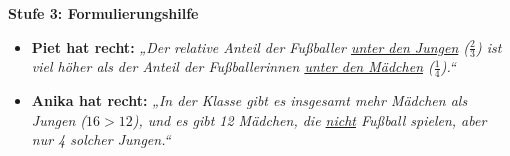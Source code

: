\documentclass[a4paper,10pt]{article}
\newcommand{\mFrac}[2]{\frac{#1}{#2}}
\begin{document}
\begin{tcolorbox}[
    enhanced, colback=white, colframe=primaryBlue, arc=3mm, boxrule=1.2pt,
    left=4.5mm, right=4.5mm, top=2.5mm, bottom=2.5mm, height=12.9cm
]
    \begin{tcolorbox}[colback=step3Bg, colframe=step3Border, arc=2mm, boxrule=0.7pt, left=3mm, right=3mm, top=1.8mm, bottom=1.8mm]
        {\color{step3Text}\bfseries\faCheckCircle\enskip Stufe 3: Formulierungshilfe}\\[0.8mm]
        {\small
        \begin{itemize}[leftmargin=4mm, itemsep=0.2pt, topsep=1pt]
            \item \textbf{Piet hat recht:} \textit{„Der relative Anteil der Fußballer \underline{unter den Jungen} ($\mFrac{2}{3}$) ist viel höher als der Anteil der Fußballerinnen \underline{unter den Mädchen} ($\mFrac{1}{4}$).“}
            \item \textbf{Anika hat recht:} \textit{„In der Klasse gibt es insgesamt mehr Mädchen als Jungen ($16 > 12$), und es gibt 12 Mädchen, die \underline{nicht} Fußball spielen, aber nur 4 solcher Jungen.“}
        \end{itemize}
        }
    \end{tcolorbox}
\end{tcolorbox}

\newpage

\end{document}
